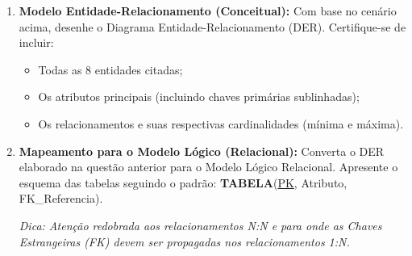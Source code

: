 \documentclass[12pt,a4paper]{article}
\newcommand{\resposta}[1]{
\noindent
\framebox[\textwidth]{
\begin{minipage}{0.98\textwidth}
\vspace{#1}
\end{minipage}
}
}
\begin{document}
\begin{enumerate}[label=\textbf{Questão \arabic*:}, leftmargin=*]
    \item \textbf{Modelo Entidade-Relacionamento (Conceitual):} 
    Com base no cenário acima, desenhe o Diagrama Entidade-Relacionamento (DER). Certifique-se de incluir:
    \begin{itemize}
        \item Todas as 8 entidades citadas;
        \item Os atributos principais (incluindo chaves primárias sublinhadas);
        \item Os relacionamentos e suas respectivas cardinalidades (mínima e máxima).
    \end{itemize}
    
    \resposta{12cm}

    \newpage

    \item \textbf{Mapeamento para o Modelo Lógico (Relacional):}
    Converta o DER elaborado na questão anterior para o Modelo Lógico Relacional. Apresente o esquema das tabelas seguindo o padrão: \textbf{TABELA}(\underline{PK}, Atributo, FK\_Referencia). 
    
    \textit{Dica: Atenção redobrada aos relacionamentos N:N e para onde as Chaves Estrangeiras (FK) devem ser propagadas nos relacionamentos 1:N.}

    \resposta{15cm}

\end{enumerate}
\end{document}
